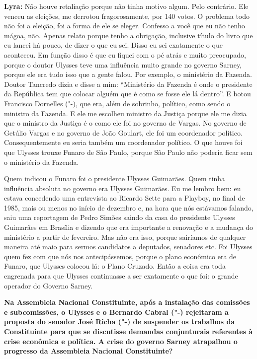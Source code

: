 \textbf{Lyra:} Não houve retaliação porque não tinha motivo algum. Pelo
contrário. Ele venceu as eleições, me derrotou fragorosamente, por 140
votos. O problema todo não foi a eleição, foi a forma de ele se eleger.
Confesso a você que eu não tenho mágoa, não. Apenas relato porque tenho
a obrigação, inclusive título do livro que eu lancei há pouco, de dizer
o que eu sei. Disso eu sei exatamente o que aconteceu. Em função disso é
que eu fiquei com o pé atrás e muito preocupado, porque o doutor Ulysses
teve uma influência muito grande no governo Sarney, porque ele era tudo
isso que a gente falou. Por exemplo, o ministério da Fazenda. Doutor
Tancredo dizia e disse a mim: ``Ministério da Fazenda é onde o
presidente da República tem que colocar alguém que é como se fosse ele
lá dentro''. E botou Francisco Dornelles ("-), que era, além de
sobrinho, político, como sendo o ministro da Fazenda. E ele me escolheu
ministro da Justiça porque ele me dizia que o ministro da Justiça é o
como ele foi no governo de Vargas. No governo de Getúlio Vargas e no
governo de João Goulart, ele foi um coordenador político.
Consequentemente eu seria também um coordenador político. O que houve
foi que Ulysses trouxe Funaro de São Paulo, porque São Paulo não poderia
ficar sem o ministério da Fazenda.

Quem indicou o Funaro foi o presidente Ulysses Guimarães. Quem tinha
influência absoluta no governo era Ulysses Guimarães. Eu me lembro bem:
eu estava concedendo uma entrevista ao Ricardo Sette para a Playboy, no
final de 1985, mais ou menos no início de dezembro e, na hora que nós
estávamos falando, saiu uma reportagem de Pedro Simões saindo da casa do
presidente Ulysses Guimarães em Brasília e dizendo que era importante a
renovação e a mudança do ministério a partir de fevereiro. Mas não era
isso, porque sairíamos de qualquer maneira até maio para sermos
candidatos a deputados, senadores etc. Foi Ulysses quem fez com que nós
nos antecipássemos, porque o plano econômico era de Funaro, que Ulysses
colocou lá: o Plano Cruzado. Então a coisa era toda engrenada para que
Ulysses continuasse a ser exatamente o que foi: o grande operador do
Governo Sarney.

\textbf{Na Assembleia Nacional Constituinte, após a instalação das
comissões e subcomissões, o Ulysses e o Bernardo Cabral ("-)
rejeitaram a proposta do senador José Richa ("-) de suspender os
trabalhos da Constituinte para que se discutisse demandas conjunturais
referentes à crise econômica e política. A crise do governo Sarney
atrapalhou o progresso da Assembleia Nacional Constituinte?}

